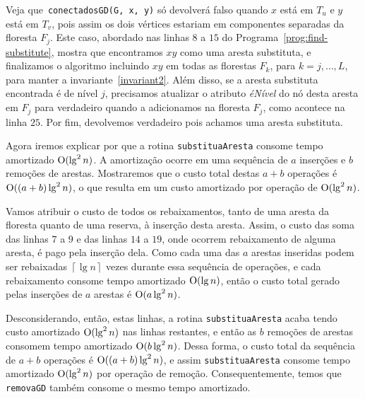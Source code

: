 Veja que~\texttt{conectadosGD(G, x, y)} só devolverá falso quando $x$ está em $T_u$ e $y$ está em $T_v$, pois assim os dois vértices estariam em componentes separadas da floresta $F_j$. Este caso, abordado nas linhas $8$ a $15$ do Programa~\ref{prog:find-substitute}, mostra que encontramos $xy$ como uma aresta substituta, e finalizamos o algoritmo incluindo $xy$ em todas as florestas $F_k$, para $k = j, \ldots, L$, para manter a invariante~\ref{invariant2}. Além disso, se a aresta substituta encontrada é de nível $j$, precisamos atualizar o atributo \textit{éNível} do nó desta aresta em $F_j$ para verdadeiro quando a adicionamos na floresta $F_j$, como acontece na linha $25$. Por fim, devolvemos verdadeiro pois achamos uma aresta substituta.

Agora iremos explicar por que a rotina \texttt{substituaAresta} consome tempo amortizado $\mathrm{O}(\lg^2 n)$. A amortização ocorre em uma sequência de $a$ inserções e $b$ remoções de arestas. Mostraremos que o custo total destas $a + b$ operações é $\mathrm{O}((a + b) \lg^2 n)$, o que resulta em um custo amortizado por operação de $\mathrm{O}(\lg^2 n)$. 

Vamos atribuir o custo de todos os rebaixamentos, tanto de uma aresta da floresta quanto de uma reserva, à inserção desta aresta. Assim, o custo das soma das linhas $7$ a $9$ e das linhas $14$ a $19$, onde ocorrem rebaixamento  de alguma aresta, é pago pela inserção dela. Como cada uma das $a$ arestas inseridas podem ser rebaixadas $\left\lceil \lg n \right\rceil$ vezes durante essa sequência de operações, e cada rebaixamento consome tempo amortizado $\mathrm{O}(\lg n)$, então o custo total gerado pelas inserções de $a$ arestas é $\mathrm{O}(a \lg^2 n)$. 

Desconsiderando, então, estas linhas, a rotina \texttt{substituaAresta} acaba tendo custo amortizado $\mathrm{O}(\lg^2 n)$ nas linhas restantes, e então as $b$ remoções de arestas consomem tempo amortizado $\mathrm{O}(b \lg^2 n)$. Dessa forma, o custo total da sequência de $a + b$ operações é $\mathrm{O}((a + b)\lg^2 n)$, e assim \texttt{substituaAresta} consome tempo amortizado $\mathrm{O}(\lg^2 n)$ por operação de remoção. Consequentemente, temos que \texttt{removaGD} também consome o mesmo tempo amortizado.